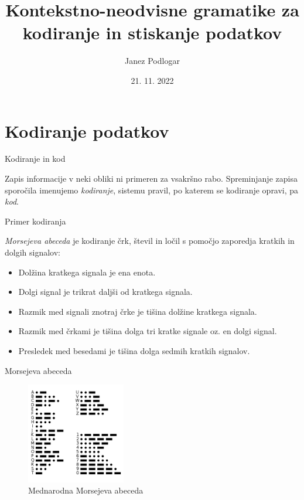 \documentclass{beamer}
\title[Gramatike za kodiranje podatkov]{Kontekstno-neodvisne gramatike za kodiranje in stiskanje podatkov}
\author{Janez Podlogar}
\institute[UL-FMF]{Univerza v Ljubljani, Fakulteta za matematiko in fiziko}
\date[November 2022]{21. 11. 2022}
\theoremstyle{definition} %
\theoremstyle{plain} %
\begin{document}
\begin{frame}
    \titlepage
\end{frame}

\section{Kodiranje podatkov}

\begin{frame}{Kodiranje in kod}
    
    Zapis informacije v neki obliki ni primeren za vsakršno rabo. Spreminjanje zapisa sporočila
    imenujemo \textit{kodiranje}, sistemu pravil, po katerem se kodiranje opravi, pa \textit{kod}. 

\end{frame}

\begin{frame}{Primer kodiranja}

    \textit{Morsejeva abeceda} je kodiranje črk, števil in ločil s pomočjo zaporedja kratkih
    in dolgih signalov:

    \begin{itemize}
        \item Dolžina kratkega signala je ena enota.
        \item Dolgi signal je trikrat daljši od kratkega signala.
        \item Razmik med signali znotraj črke je tišina dolžine kratkega signala.
        \item Razmik med črkami je tišina dolga tri kratke signale oz. en dolgi signal.
        \item Presledek med besedami je tišina dolga sedmih kratkih signalov.
    \end{itemize}

\end{frame}

\begin{frame}{Morsejeva abeceda}

    \begin{figure}[h]
        \centering
        \includegraphics[width=4.3cm]{International_Morse_Code.svg.png}
        \caption{Mednarodna Morsejeva abeceda}
    \end{figure}
    
\end{frame}
\end{document}
